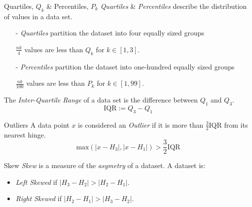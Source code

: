 \documentclass[11pt,a4paper]{article}
\begin{document}
\begin{definition}{Quartiles, $Q_k$ \& Percentiles, $P_k$}
  \textit{Quartiles} \& \textit{Percentiles} describe the distribution of values in a data set.
  \begin{itemize}
    \item[-] \textit{Quartiles} partition the dataset into four equally sized groups \begin{center}$\frac{nk}4$ values are less than $Q_k$ for $k\in[1,3]$.\end{center}
    \item[-] \textit{Percentiles} partition the dataset into one-hundred equally sized groups
    \begin{center} $\frac{nk}{100}$ values are less than $P_k$ for $k\in[1,99]$. \end{center}
  \end{itemize}
  The \textit{Inter-Quartile Range} of a data set is the difference between $Q_1$ and $Q_3$.
  \[ \text{IQR}:=Q_3-Q_1\]
\end{definition}

\begin{definition}{Outliers}
A data point $x$ is considered an \textit{Outlier} if it is more than $\frac32\text{IQR}$ from its nearest hinge.
\[\text{max}\left(|x-H_3|,|x-H_1|\right)>\frac32\text{IQR}\]
\end{definition}

\begin{definition}{Skew}
  \textit{Skew} is a measure of the \textit{asymetry} of a dataset. A dataset is:
  \begin{itemize}
    \item \textit{Left Skewed} if $|H_3-H_2|>|H_2-H_1|$.
    \item \textit{Right Skewed} if $|H_2-H_1|>|H_3-H_2|$.
  \end{itemize}
\end{definition}

%
\end{document}
